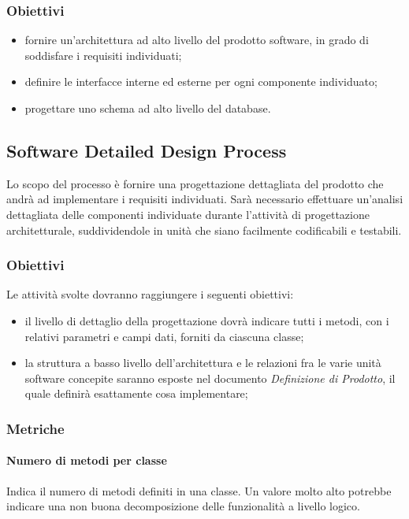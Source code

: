 		\subsubsection{Obiettivi}
			\begin{itemize}
				\item fornire un'architettura ad alto livello del prodotto software, in grado di soddisfare i requisiti individuati;
				\item definire le interfacce interne ed esterne per ogni componente individuato;
				\item progettare uno schema ad alto livello del database. 
			\end{itemize}
	
	\subsection{Software Detailed Design Process}
	Lo scopo del processo è fornire una progettazione dettagliata del prodotto che andrà ad implementare i requisiti individuati.
	Sarà necessario effettuare un’analisi dettagliata delle componenti individuate durante l'attività di progettazione
	architetturale, suddividendole in unità che siano facilmente codificabili e testabili.
		
		\subsubsection{Obiettivi}
		Le attività svolte dovranno raggiungere i seguenti obiettivi:
		\begin{itemize}
			\item il livello di dettaglio della progettazione dovrà indicare tutti i metodi, con i relativi parametri e campi dati, forniti da ciascuna classe;
			\item la struttura a basso livello dell’architettura e le relazioni fra le varie unità software concepite saranno esposte nel documento \textit{Definizione di Prodotto}, il quale definirà esattamente cosa implementare;
		\end{itemize}
		
		\subsubsection{Metriche}
			
			\paragraph{Numero di metodi per classe}
			Indica il numero di metodi definiti in una classe.
			Un valore molto alto potrebbe indicare una
			non buona decomposizione delle funzionalità a livello logico.
			
